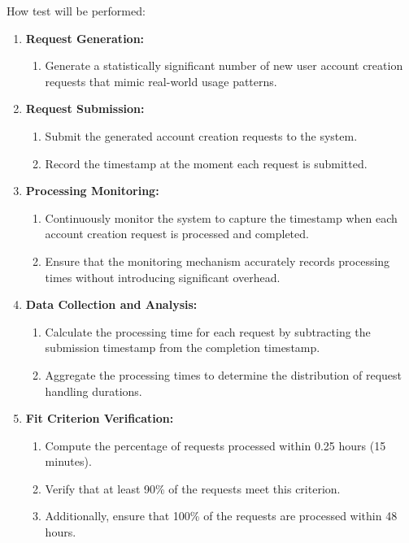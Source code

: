 \documentclass[12pt, titlepage]{article}
\begin{document}
\begin{enumerate}
How test will be performed:
\begin{enumerate}
    \item \textbf{Request Generation:}
    \begin{enumerate}
        \item Generate a statistically significant number of new user account creation requests that mimic real-world usage patterns.
    \end{enumerate}
    \item \textbf{Request Submission:}
    \begin{enumerate}
        \item Submit the generated account creation requests to the system.
        \item Record the timestamp at the moment each request is submitted.
    \end{enumerate}
    \item \textbf{Processing Monitoring:}
    \begin{enumerate}
        \item Continuously monitor the system to capture the timestamp when each account creation request is processed and completed.
        \item Ensure that the monitoring mechanism accurately records processing times without introducing significant overhead.
    \end{enumerate}
    \item \textbf{Data Collection and Analysis:}
    \begin{enumerate}
        \item Calculate the processing time for each request by subtracting the submission timestamp from the completion timestamp.
        \item Aggregate the processing times to determine the distribution of request handling durations.
    \end{enumerate}
    \item \textbf{Fit Criterion Verification:}
    \begin{enumerate}
        \item Compute the percentage of requests processed within 0.25 hours (15 minutes).
        \item Verify that at least 90\% of the requests meet this criterion.
        \item Additionally, ensure that 100\% of the requests are processed within 48 hours.
    \end{enumerate}
\end{enumerate}


\end{enumerate}
\end{document}
